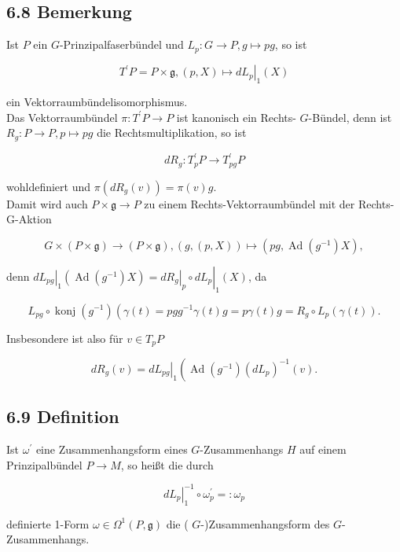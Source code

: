 \documentclass[10pt, letterpaper]{article}
\begin{document}
\subsection*{6.8 Bemerkung}
Ist $P$ ein $G$-Prinzipalfaserbündel und $L_{p}: G \rightarrow P, g \mapsto p g$, so ist

$$
T^{\prime} P=P \times \mathfrak{g},\left.(p, X) \mapsto d L_{p}\right|_{1}(X)
$$

ein Vektorraumbündelisomorphismus.\\
Das Vektorraumbündel $\pi: T^{\prime} P \rightarrow P$ ist kanonisch ein Rechts- $G$-Bündel, denn ist $R_{g}: P \rightarrow P, p \mapsto p g$ die Rechtsmultiplikation, so ist

$$
d R_{g}: T_{p}^{\prime} P \rightarrow T_{p g}^{\prime} P
$$

wohldefiniert und $\pi\left(d R_{g}(v)\right)=\pi(v) g$.\\
Damit wird auch $P \times \mathfrak{g} \rightarrow P$ zu einem Rechts-Vektorraumbündel mit der Rechts-G-Aktion

$$
G \times(P \times \mathfrak{g}) \rightarrow(P \times \mathfrak{g}),(g,(p, X)) \mapsto\left(p g, \operatorname{Ad}\left(g^{-1}\right) X\right),
$$

denn $\left.d L_{p g}\right|_{1}\left(\operatorname{Ad}\left(g^{-1}\right) X\right)=\left.\left.d R_{g}\right|_{p} \circ d L_{p}\right|_{1}(X)$, da

$$
L_{p g} \circ \operatorname{konj}\left(g^{-1}\right)\left(\gamma(t)=p g g^{-1} \gamma(t) g=p \gamma(t) g=R_{g} \circ L_{p}(\gamma(t)) .\right.
$$

Insbesondere ist also für $v \in T_{p} P$


\begin{equation*}
d R_{g}(v)=\left.d L_{p g}\right|_{1}\left(\operatorname{Ad}\left(g^{-1}\right)\left(d L_{p}\right)^{-1}(v) .\right. \tag{*}
\end{equation*}


\subsection*{6.9 Definition}
Ist $\omega^{\prime}$ eine Zusammenhangsform eines $G$-Zusammenhangs $H$ auf einem Prinzipalbündel $P \rightarrow M$, so heißt die durch

$$
\left.d L_{p}\right|_{1} ^{-1} \circ \omega_{p}^{\prime}=: \omega_{p}
$$

definierte 1-Form $\omega \in \Omega^{1}(P, \mathfrak{g})$ die ( $G$-)Zusammenhangsform des $G$-Zusammenhangs.
\end{document}

